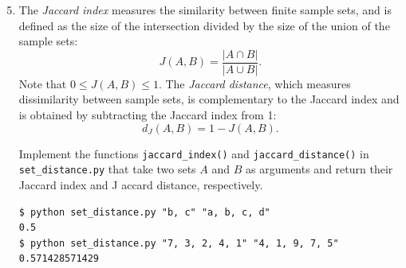 \documentclass[8pt,a4paper,compress]{beamer}
\begin{document}
\begin{frame}[fragile]
\begin{enumerate}\setcounter{enumi}{4}
\item The \emph{Jaccard index} measures the similarity between finite sample sets, and is defined as the size of the intersection divided by the size of the union of the sample sets: $$J(A, B) = \frac{|A\cap B|}{|A\cup B|}.$$ Note that $0 \leq J(A, B) \leq 1$. The \emph{Jaccard distance}, which measures dissimilarity between sample sets, is complementary to the Jaccard index and is obtained by subtracting the Jaccard index from 1: $$d_J(A, B)=1-J(A, B).$$

\noindent Implement the functions \lstinline{jaccard_index()} and \lstinline{jaccard_distance()} in \lstinline{set_distance.py} that take two sets $A$ and $B$ as arguments and return their Jaccard index and J
accard distance, respectively.

\begin{lstlisting}
$ python set_distance.py "b, c" "a, b, c, d"
0.5
$ python set_distance.py "7, 3, 2, 4, 1" "4, 1, 9, 7, 5"
0.571428571429
\end{lstlisting} 
\end{enumerate}
\end{frame}
\end{document}
